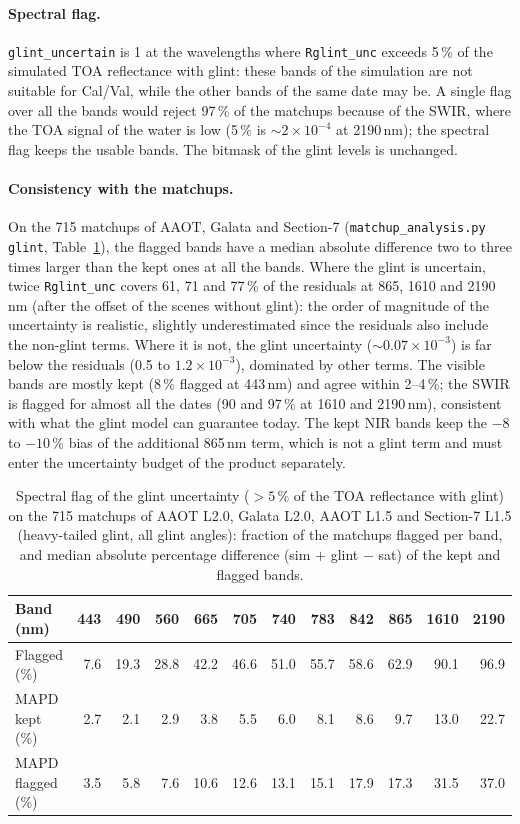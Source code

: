 \documentclass[11pt,a4paper]{article}
\newcommand{\code}[1]{\texttt{#1}}
\begin{document}
\paragraph{Spectral flag.} \code{glint\_uncertain} is 1 at the wavelengths where \code{Rglint\_unc} exceeds 5\,\% of
the simulated TOA reflectance with glint: these bands of the simulation are not suitable for Cal/Val, while the
other bands of the same date may be. A single flag over all the bands would reject 97\,\% of the matchups because of
the SWIR, where the TOA signal of the water is low (5\,\% is $\sim2\times10^{-4}$ at 2190\,nm); the spectral flag keeps
the usable bands. The bitmask of the glint levels is unchanged.

\paragraph{Consistency with the matchups.} On the 715 matchups of AAOT, Galata and Section-7
(\code{matchup\_analysis.py glint}, Table~\ref{tab:glint_unc}), the flagged bands have a median absolute difference two
to three times larger than the kept ones at all the bands. Where the glint is uncertain, twice \code{Rglint\_unc}
covers 61, 71 and 77\,\% of the residuals at 865, 1610 and 2190\,nm (after the offset of the scenes without glint):
the order of magnitude of the uncertainty is realistic, slightly underestimated since the residuals also include the
non-glint terms. Where it is not, the glint uncertainty ($\sim0.07\times10^{-3}$) is far below the residuals (0.5 to
$1.2\times10^{-3}$), dominated by other terms. The visible bands are mostly kept (8\,\% flagged at 443\,nm) and agree
within 2--4\,\%; the SWIR is flagged for almost all the dates (90 and 97\,\% at 1610 and 2190\,nm), consistent with what
the glint model can guarantee today. The kept NIR bands keep the $-8$ to $-10\,\%$ bias of the additional 865\,nm term,
which is not a glint term and must enter the uncertainty budget of the product separately.

\begin{table}[h]
\centering\small
\caption{Spectral flag of the glint uncertainty ($>5\,\%$ of the TOA reflectance with glint) on the 715 matchups of
AAOT L2.0, Galata L2.0, AAOT L1.5 and Section-7 L1.5 (heavy-tailed glint, all glint angles): fraction of the matchups
flagged per band, and median absolute percentage difference (sim $+$ glint $-$ sat) of the kept and flagged bands.}
\label{tab:glint_unc}
\begin{tabular}{lrrrrrrrrrrr}
\toprule
Band (nm) & 443 & 490 & 560 & 665 & 705 & 740 & 783 & 842 & 865 & 1610 & 2190 \\
\midrule
Flagged (\%)        & 7.6 & 19.3 & 28.8 & 42.2 & 46.6 & 51.0 & 55.7 & 58.6 & 62.9 & 90.1 & 96.9 \\
MAPD kept (\%)      & 2.7 & 2.1  & 2.9  & 3.8  & 5.5  & 6.0  & 8.1  & 8.6  & 9.7  & 13.0 & 22.7 \\
MAPD flagged (\%)   & 3.5 & 5.8  & 7.6  & 10.6 & 12.6 & 13.1 & 15.1 & 17.9 & 17.3 & 31.5 & 37.0 \\
\bottomrule
\end{tabular}
\end{table}
\end{document}
